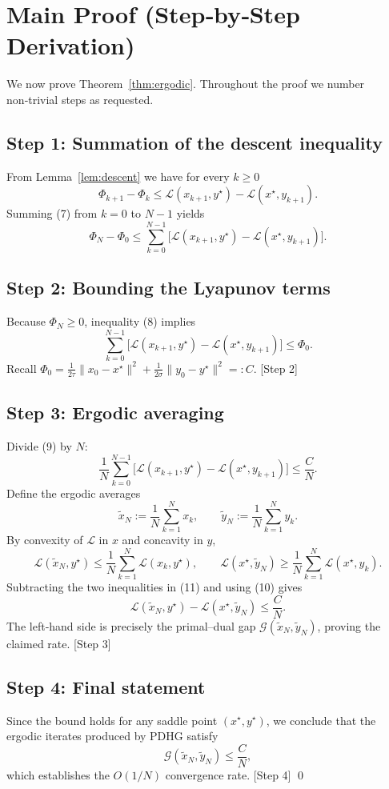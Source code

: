 \documentclass{article}
\begin{document}
\section*{Main Proof (Step‑by‑Step Derivation)}
We now prove Theorem~\ref{thm:ergodic}. Throughout the proof we number
non‑trivial steps as requested.

\subsection*{Step 1: Summation of the descent inequality}
From Lemma~\ref{lem:descent} we have for every $k\ge0$
\[
\Phi_{k+1}-\Phi_{k}
\le \mathcal L(x_{k+1},y^{\star})-\mathcal L(x^{\star},y_{k+1}). \tag{7}
\]
Summing (7) from $k=0$ to $N-1$ yields
\[
\Phi_{N}-\Phi_{0}
\le \sum_{k=0}^{N-1}\bigl[\mathcal L(x_{k+1},y^{\star})-
\mathcal L(x^{\star},y_{k+1})\bigr]. \tag{8}
\]

\subsection*{Step 2: Bounding the Lyapunov terms}
Because $\Phi_N\ge0$, inequality (8) implies
\[
\sum_{k=0}^{N-1}\bigl[\mathcal L(x_{k+1},y^{\star})-
\mathcal L(x^{\star},y_{k+1})\bigr]
\le \Phi_{0}. \tag{9}
\]
Recall $\Phi_{0}= \frac{1}{2\tau}\|x_{0}-x^{\star}\|^{2}
               +\frac{1}{2\sigma}\|y_{0}-y^{\star}\|^{2}=:C$. \hfill[Step 2]

\subsection*{Step 3: Ergodic averaging}
Divide (9) by $N$:
\[
\frac{1}{N}\sum_{k=0}^{N-1}\bigl[\mathcal L(x_{k+1},y^{\star})-
\mathcal L(x^{\star},y_{k+1})\bigr]\le \frac{C}{N}. \tag{10}
\]
Define the ergodic averages
\[
\tilde x_{N}:=\frac{1}{N}\sum_{k=1}^{N}x_{k},
\qquad
\tilde y_{N}:=\frac{1}{N}\sum_{k=1}^{N}y_{k}.
\]
By convexity of $\mathcal L$ in $x$ and concavity in $y$,
\[
\mathcal L(\tilde x_{N},y^{\star})\le
\frac{1}{N}\sum_{k=1}^{N}\mathcal L(x_{k},y^{\star}),\qquad
\mathcal L(x^{\star},\tilde y_{N})\ge
\frac{1}{N}\sum_{k=1}^{N}\mathcal L(x^{\star},y_{k}). \tag{11}
\]
Subtracting the two inequalities in (11) and using (10) gives
\[
\mathcal L(\tilde x_{N},y^{\star})-
\mathcal L(x^{\star},\tilde y_{N})
\le \frac{C}{N}. \tag{12}
\]
The left‑hand side is precisely the primal–dual gap
$\mathcal G(\tilde x_{N},\tilde y_{N})$, proving the claimed rate. \hfill[Step 3]

\subsection*{Step 4: Final statement}
Since the bound holds for any saddle point $(x^{\star},y^{\star})$, we
conclude that the ergodic iterates produced by PDHG satisfy
\[
\mathcal G(\tilde x_{N},\tilde y_{N})\le \frac{C}{N},
\]
which establishes the $O(1/N)$ convergence rate. \hfill[Step 4] \qed
\end{document}
